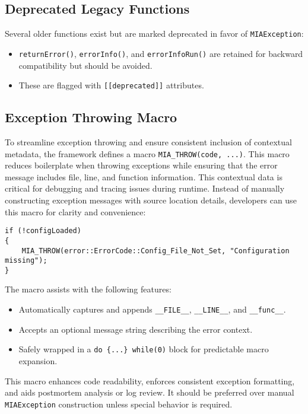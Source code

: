 \subsection*{Deprecated Legacy Functions}
Several older functions exist but are marked deprecated in favor of \texttt{MIAException}:
\begin{itemize}
	\item \texttt{returnError()}, \texttt{errorInfo()}, and \texttt{errorInfoRun()} are retained for backward compatibility but should be avoided.
	\item These are flagged with \texttt{[[deprecated]]} attributes.
\end{itemize}


\subsection*{Exception Throwing Macro}
To streamline exception throwing and ensure consistent inclusion of contextual metadata, the framework defines a macro \texttt{MIA\_THROW(code, ...)}. This macro reduces boilerplate when throwing exceptions while ensuring that the error message includes file, line, and function information. This contextual data is critical for debugging and tracing issues during runtime. Instead of manually constructing exception messages with source location details, developers can use this macro for clarity and convenience:
\begin{lstlisting}[style=cppstyle]
if (!configLoaded)
{
    MIA_THROW(error::ErrorCode::Config_File_Not_Set, "Configuration missing");
}
\end{lstlisting}
The macro assists with the following features:
\begin{itemize}
    \item Automatically captures and appends \texttt{\_\_FILE\_\_}, \texttt{\_\_LINE\_\_}, and \texttt{\_\_func\_\_}.
    \item Accepts an optional message string describing the error context.
    \item Safely wrapped in a \texttt{do \{...\} while(0)} block for predictable macro expansion.
\end{itemize}
This macro enhances code readability, enforces consistent exception formatting, and aids postmortem analysis or log review. It should be preferred over manual \texttt{MIAException} construction unless special behavior is required.



